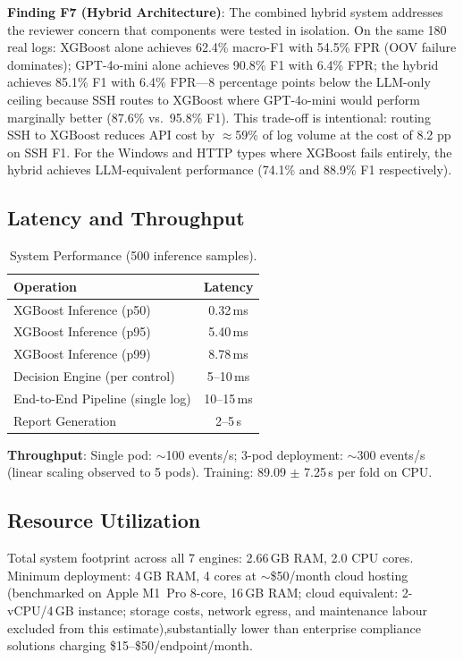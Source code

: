 \documentclass[futureinternet,article,submit,pdftex,moreauthors]{Definitions/mdpi}
\begin{document}
\textbf{Finding F7 (Hybrid Architecture)}: The combined hybrid system addresses the
reviewer concern that components were tested in isolation. On the same 180 real logs:
XGBoost alone achieves 62.4\% macro-F1 with 54.5\% FPR (OOV failure dominates);
GPT-4o-mini alone achieves 90.8\% F1 with 6.4\% FPR; the hybrid achieves 85.1\% F1
with 6.4\% FPR---8 percentage points below the LLM-only ceiling because SSH routes to
XGBoost where GPT-4o-mini would perform marginally better (87.6\% vs.\ 95.8\% F1).
This trade-off is intentional: routing SSH to XGBoost reduces API cost by $\approx$59\%
of log volume at the cost of 8.2 pp on SSH F1. For the Windows and HTTP types where
XGBoost fails entirely, the hybrid achieves LLM-equivalent performance (74.1\% and
88.9\% F1 respectively).

\subsection{Latency and Throughput}

\begin{table}[H]
\caption{System Performance (500 inference samples).\label{tab:performance}}
\begin{tabularx}{\textwidth}{lC}
\toprule
\textbf{Operation} & \textbf{Latency} \\
\midrule
XGBoost Inference (p50) & 0.32\,ms \\
XGBoost Inference (p95) & 5.40\,ms \\
XGBoost Inference (p99) & 8.78\,ms \\
Decision Engine (per control) & 5--10\,ms \\
End-to-End Pipeline (single log) & 10--15\,ms \\
Report Generation & 2--5\,s \\
\bottomrule
\end{tabularx}
\end{table}

\textbf{Throughput}: Single pod: $\sim$100 events/s; 3-pod deployment: $\sim$300 events/s
(linear scaling observed to 5 pods). Training: 89.09 $\pm$ 7.25\,s per fold on CPU.

\subsection{Resource Utilization}

Total system footprint across all 7 engines: 2.66\,GB RAM, 2.0 CPU cores. Minimum deployment:
4\,GB RAM, 4 cores at $\sim$\$50/month cloud hosting (benchmarked on Apple M1~Pro 8-core,
16\,GB RAM; cloud equivalent: 2-vCPU/4\,GB instance; storage costs, network egress, and
maintenance labour excluded from this estimate),substantially lower than enterprise
compliance solutions charging \$15--\$50/endpoint/month.
\end{document}
